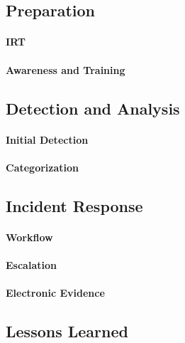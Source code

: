 \subsection{Preparation}

\paragraph{\acl{IRT}}

\paragraph{Awareness and Training}

\subsection{Detection and Analysis}

\paragraph{Initial Detection}

\paragraph{Categorization}

\subsection{Incident Response}

\paragraph{Workflow}

\paragraph{Escalation}

\paragraph{Electronic Evidence}

\subsection{Lessons Learned}